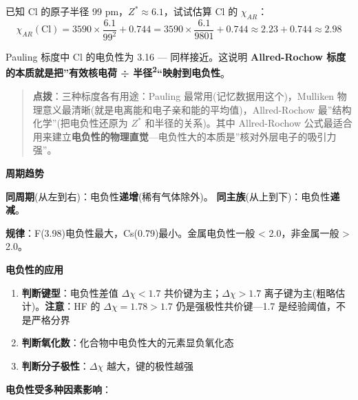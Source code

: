 已知 Cl 的原子半径 99 pm，\(Z^* \approx 6.1\)，试试估算 Cl 的 \(\chi_{AR}\)：
\[\chi_{AR}(\mathrm{Cl}) = 3590 \times \frac{6.1}{99^2} + 0.744 = 3590 \times \frac{6.1}{9801} + 0.744 \approx 2.23 + 0.744 \approx 2.98\]

Pauling 标度中 Cl 的电负性为 3.16 --- 同样接近。这说明 \textbf{Allred-Rochow 标度的本质就是把''有效核电荷 ÷ 半径\textsuperscript{2}``映射到电负性}。

\begin{quote}
\textbf{点拨}：三种标度各有用途：Pauling 最常用(记忆数据用这个)，Mulliken 物理意义最清晰(就是电离能和电子亲和能的平均值)，Allred-Rochow 最''结构化学''(把电负性还原为 \(Z^*\) 和半径的关系)。其中 Allred-Rochow 公式最适合用来建立\textbf{电负性的物理直觉}---电负性大的本质是''核对外层电子的吸引力强''。
\end{quote}

\textbf{周期趋势}

\textbf{同周期}(从左到右)：电负性\textbf{递增}(稀有气体除外)。
\textbf{同主族}(从上到下)：电负性\textbf{递减}。

\textbf{规律}：F(3.98)电负性最大，Cs(0.79)最小。金属电负性一般 \textless{} 2.0，非金属一般 \textgreater{} 2.0。

\textbf{电负性的应用}

\begin{enumerate}
\def\labelenumi{\arabic{enumi}.}
\tightlist
\item
  \textbf{判断键型}：电负性差值 \(\Delta\chi < 1.7\) \箭 共价键为主；\(\Delta\chi > 1.7\) \箭 离子键为主(粗略估计)。\textbf{注意}：HF 的 \(\Delta\chi = 1.78 > 1.7\) 仍是强极性共价键---1.7 是经验阈值，不是严格分界
\item
  \textbf{判断氧化数}：化合物中电负性大的元素显负氧化态
\item
  \textbf{判断分子极性}：\(\Delta\chi\) 越大，键的极性越强
\end{enumerate}

\textbf{电负性受多种因素影响}：

